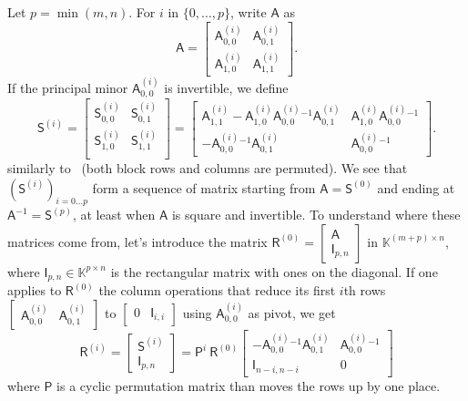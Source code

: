 \documentclass{sig-alternate}
\newcommand{\mA}{\ensuremath{\mathsf{A}}}
\newcommand{\mI}{\ensuremath{\mathsf{I}}}
\newcommand{\mP}{\ensuremath{\mathsf{P}}}
\newcommand{\mR}{\ensuremath{\mathsf{R}}}
\newcommand{\mS}{\ensuremath{\mathsf{S}}}
\newcommand{\K}{\ensuremath{\mathbb{K}}}
\begin{document}
Let $p=\min(m,n)$. For $i$ in $\{0,\dots,p\}$, write $\mA$ as
$$
\mA=\begin{bmatrix}
    \mA^{(i)}_{0,0} & \mA^{(i)}_{0,1} \\[1mm]
    \mA^{(i)}_{1,0} & \mA^{(i)}_{1,1}
  \end{bmatrix}.
$$ 
If the principal minor ${\mA^{(i)}_{0,0}}$ is invertible, we define
$$
\mS^{(i)} = 
\begin{bmatrix} 
     \mS^{(i)}_{0,0} & \mS^{(i)}_{0,1}\\
     \mS^{(i)}_{1,0} & \mS^{(i)}_{1,1}\\
\end{bmatrix} = 
\begin{bmatrix} 
  \mA^{(i)}_{1,1} - \mA^{(i)}_{1,0} {\mA^{(i)}_{0,0}}{}^{-1} \mA^{(i)}_{0,1} 
  & 
  \mA^{(i)}_{1,0} {\mA^{(i)}_{0,0}}{}^{-1} 
  \\[1mm]
  -{\mA^{(i)}_{0,0}}{}^{-1} \mA^{(i)}_{0,1}
  &  
  {\mA^{(i)}_{0,0}}{}^{-1} 
\end{bmatrix}.
$$
similarly to~\cite{Cardinal99} (both block rows and columns are
permuted).  We see that $( \mS^{(i)})_{i=0\dots p}$ form a sequence of
matrix starting from $\mA=\mS^{(0)}$ and ending at
$\mA^{-1}=\mS^{(p)}$, at least when $\mA$ is square and invertible. To
understand where these matrices come from, let's introduce the matrix
$ \mR^{(0)} = \begin{bmatrix}
  \mA \\
  \mI_{p, n}
\end{bmatrix} 
$
in $\K^{(m + p) \times n} $, where $\mI_{p, n} \in \K^{p \times n}$ is
the rectangular matrix with ones on the diagonal. If one applies to
$\mR^{(0)}$ the column operations that reduce its first $i$th rows
$\begin{bmatrix} \mA^{(i)}_{0,0} & \mA^{(i)}_{0,1} \end{bmatrix}$ to
$\begin{bmatrix} 0 & \mI_{i,i} \end{bmatrix}$ using $\mA^{(i)}_{0,0}$
as pivot, we get
\begin{equation}\label{eq:Ri}
\mR^{(i)} =
\begin{bmatrix}
  \mS^{(i)} \\
  \mI_{p, n}
\end{bmatrix} 
= \mP^i \ \mR^{(0)} 
\begin{bmatrix}
  - \mA_{0, 0}^{(i)} \phantom{}^{- 1} \mA_{0, 1}^{(i)}
  & 
  \mA_{0, 0}^{(i)} \phantom{}^{- 1} \\
 \mI_{n - i,n-i} & 0
\end{bmatrix}
\end{equation}
where $\mP$ is a cyclic permutation matrix than moves the rows up by one place.
\end{document}
